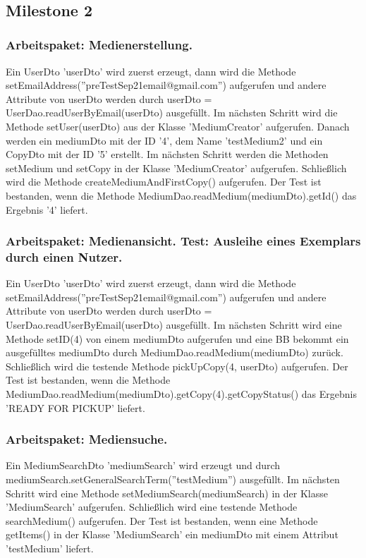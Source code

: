 \documentclass{article}
\begin{document}
­\subsection{Milestone 2}
\subsubsection{Arbeitspaket: Medienerstellung.}
Ein UserDto 'userDto' wird zuerst erzeugt, dann wird die Methode \linebreak setEmailAddress(''preTestSep21email@gmail.com'') aufgerufen und andere Attribute von userDto werden durch userDto = UserDao.readUserByEmail(userDto) ausgefüllt. Im nächsten Schritt wird die Methode setUser(userDto) aus der Klasse 'MediumCreator' aufgerufen. Danach werden ein mediumDto mit der ID '4', dem Name 'testMedium2' und ein CopyDto mit der ID '5' erstellt. Im nächsten Schritt werden die Methoden setMedium und setCopy in der Klasse 'MediumCreator' aufgerufen. Schließlich wird die Methode createMediumAndFirstCopy() aufgerufen. Der Test ist bestanden, wenn die Methode MediumDao.readMedium(mediumDto).getId() das Ergebnis '4' liefert.

\subsubsection{Arbeitspaket: Medienansicht. Test: Ausleihe eines Exemplars durch einen Nutzer.}
Ein UserDto 'userDto' wird zuerst erzeugt, dann wird die Methode \linebreak setEmailAddress(''preTestSep21email@gmail.com'') aufgerufen und andere Attribute von userDto werden durch userDto = UserDao.readUserByEmail(userDto) ausgefüllt. Im nächsten Schritt wird eine Methode setID(4) von einem mediumDto aufgerufen und eine BB bekommt ein ausgefülltes mediumDto durch MediumDao.readMedium(mediumDto) zurück. Schließlich wird die testende Methode pickUpCopy(4, userDto) aufgerufen. Der Test ist bestanden, wenn die Methode MediumDao.readMedium(mediumDto).getCopy(4).getCopyStatus() das Ergebnis 'READY FOR PICKUP' liefert.

\subsubsection{Arbeitspaket: Mediensuche.}
Ein MediumSearchDto 'mediumSearch' wird erzeugt und durch \linebreak mediumSearch.setGeneralSearchTerm(''testMedium'') ausgefüllt. Im nächsten Schritt wird eine Methode setMediumSearch(mediumSearch) in der Klasse 'MediumSearch' aufgerufen. Schließlich wird eine testende Methode searchMedium() aufgerufen. Der Test ist bestanden, wenn eine Methode getItems() in der Klasse 'MediumSearch' ein mediumDto mit einem Attribut 'testMedium' liefert.
\end{document}

